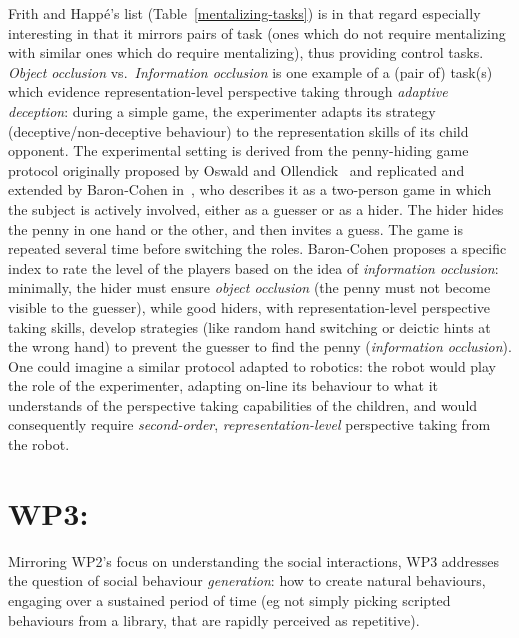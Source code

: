 \documentclass[11pt,a4paper]{report}
\begin{document}
Frith and Happé's list (Table~\ref{mentalizing-tasks}) is in that regard
especially interesting in that it mirrors pairs of task (ones which do not
require mentalizing with similar ones which do require mentalizing), thus
providing control tasks.  \emph{Object occlusion} vs.~\emph{Information
occlusion} is one example of a (pair of) task(s) which evidence
representation-level perspective taking through \emph{adaptive deception}:
during a simple game, the experimenter adapts its strategy
(deceptive/non-deceptive behaviour) to the representation skills of its child
opponent. The experimental setting is derived from the penny-hiding game
protocol originally proposed by Oswald and Ollendick~\cite{oswald1989role} and
replicated and extended by Baron-Cohen in~\cite{baron1992out}, who describes it
as a two-person game in which the subject is actively involved, either as a
guesser or as a hider. The hider hides the penny in one hand or the other, and
then invites a guess. The game is repeated several time before switching the
roles. Baron-Cohen proposes a specific index to rate the level of the players
based on the idea of \emph{information occlusion}: minimally, the hider must
ensure \emph{object occlusion} (the penny must not become visible to the
guesser), while good hiders, with representation-level perspective taking
skills, develop strategies (like random hand switching or deictic hints at the
wrong hand) to prevent the guesser to find the penny (\emph{information
occlusion}). One could imagine a similar protocol adapted to robotics: the robot
would play the role of the experimenter, adapting on-line its
behaviour to what it understands of the perspective taking capabilities of the
children, and would consequently require \emph{second-order},
\emph{representation-level} perspective taking from the robot.



\section{WP3: \textbf{\wpThree}} 


Mirroring WP2's focus on understanding the social interactions, WP3 addresses the
question of social behaviour \emph{generation}: how to create natural
behaviours, engaging over a sustained period of time (eg not simply picking
scripted behaviours from a library, that are rapidly perceived as repetitive).
\end{document}
